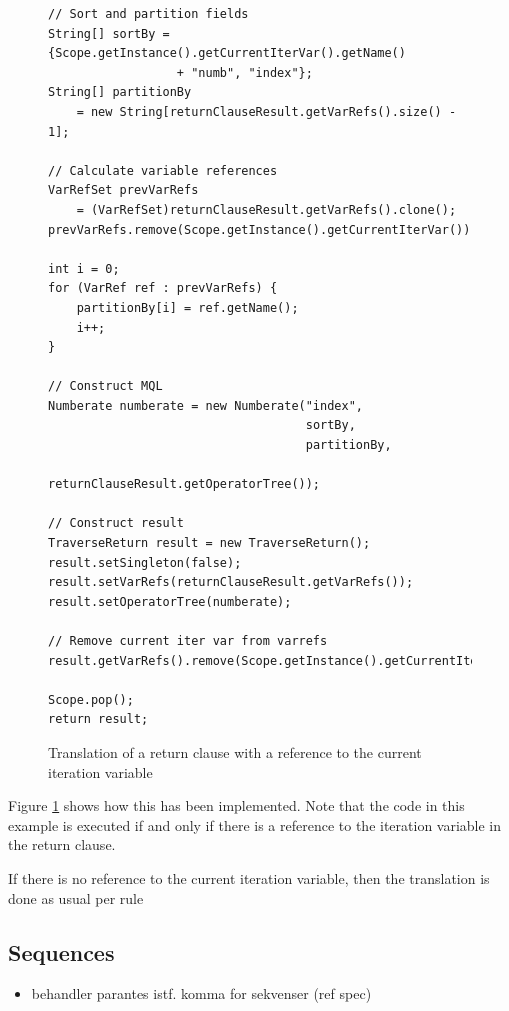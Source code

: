 \begin{figure}[!htp]
\begin{center}
\lstset{language=Java,numbers=left}
\begin{lstlisting}
// Sort and partition fields
String[] sortBy = {Scope.getInstance().getCurrentIterVar().getName() 
		          + "numb", "index"};
String[] partitionBy 
	= new String[returnClauseResult.getVarRefs().size() - 1];

// Calculate variable references
VarRefSet prevVarRefs 
	= (VarRefSet)returnClauseResult.getVarRefs().clone();         
prevVarRefs.remove(Scope.getInstance().getCurrentIterVar());

int i = 0;
for (VarRef ref : prevVarRefs) {
    partitionBy[i] = ref.getName();
    i++;
}

// Construct MQL
Numberate numberate = new Numberate("index", 
                                    sortBy, 
                                    partitionBy, 
                                    returnClauseResult.getOperatorTree());

// Construct result
TraverseReturn result = new TraverseReturn();
result.setSingleton(false);
result.setVarRefs(returnClauseResult.getVarRefs());
result.setOperatorTree(numberate);

// Remove current iter var from varrefs
result.getVarRefs().remove(Scope.getInstance().getCurrentIterVar());

Scope.pop();
return result;
\end{lstlisting}
  \caption{Translation of a return clause with a reference to the current
  iteration variable}
  \label{fig:impl:td:for_return_withref}
\end{center}
\end{figure}

Figure \ref{fig:impl:td:for_return_withref} shows how this has been
implemented. Note that the code in this example is executed if and only if
there is a reference to the iteration variable in the return clause.

If there is no reference to the current iteration variable, then the
translation is done as usual per rule 

\subsection{Sequences}
\label{sect:impl:td:seq}
\begin{itemize}
  \item behandler parantes istf. komma for sekvenser (ref spec) 
\end{itemize}